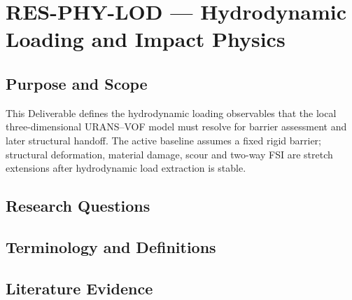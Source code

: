 
\section{RES-PHY-LOD --- Hydrodynamic Loading and Impact Physics}
\label{sec:res-phy-lod}

\subsection{Purpose and Scope}
\label{sec:res-phy-lod-purpose}


This Deliverable defines the hydrodynamic loading observables that the
local three-dimensional URANS--VOF model must resolve for barrier
assessment and later structural handoff. The active baseline assumes a
fixed rigid barrier; structural deformation, material damage, scour and
two-way FSI are stretch extensions after hydrodynamic load extraction
is stable.

\subsection{Research Questions}
\label{sec:res-phy-lod-research-questions}


\subsection{Terminology and Definitions}
\label{sec:res-phy-lod-definitions}


\subsection{Literature Evidence}
\label{sec:res-phy-lod-literature-evidence}

